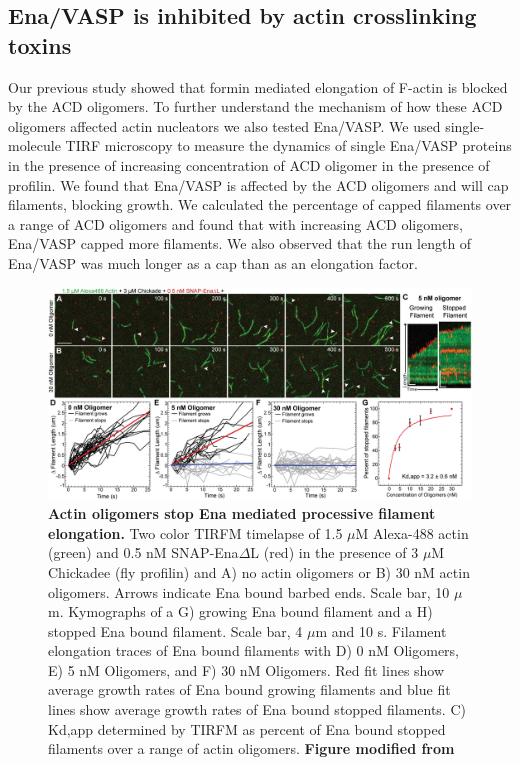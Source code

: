 \subsection{Ena/VASP is inhibited by actin crosslinking toxins}\label{ena-acd-oligomers}
Our previous study showed that formin mediated elongation of F-actin is blocked by the ACD oligomers. To further understand the mechanism of how these ACD oligomers affected actin nucleators we also tested Ena/VASP. We used single-molecule TIRF microscopy to measure the dynamics of single Ena/VASP proteins in the presence of increasing concentration of ACD oligomer in the presence of profilin. We found that Ena/VASP is affected by the ACD oligomers and will cap filaments, blocking growth. We calculated the percentage of capped filaments over a range of ACD oligomers and found that with increasing ACD oligomers, Ena/VASP capped more filaments. We also observed that the run length of Ena/VASP was much longer as a cap than as an elongation factor. 

\begin{figure}
\centering
\includegraphics[width=\textwidth]{img/ch04/Oligomer_Ena_Figure.jpg}
\caption[Actin oligomers stop Ena mediated processive filament elongation.]{\textbf{Actin oligomers stop Ena mediated processive filament elongation.} Two color TIRFM timelapse of 1.5 $\mu$M Alexa-488 actin (green) and 0.5 nM SNAP-Ena$\Delta$L (red) in the presence of 3 $\mu$M Chickadee (fly profilin) and A) no actin oligomers or B) 30 nM actin oligomers. Arrows indicate Ena bound barbed ends. Scale bar, 10 $\mu$m. Kymographs of a G) growing Ena bound filament and a H) stopped Ena bound filament. Scale bar, 4 $\mu$m and 10 s. Filament elongation traces of Ena bound filaments with D) 0 nM Oligomers, E) 5 nM Oligomers, and F) 30 nM Oligomers. Red fit lines show average growth rates of Ena bound growing filaments and blue fit lines show average growth rates of Ena bound stopped filaments. C) Kd,app determined by TIRFM as percent of Ena bound stopped filaments over a range of actin oligomers. \textbf{Figure modified from \citep{kudryashova_actin_2018}}}
\label{fig:ena-oligomers}
\end{figure}

